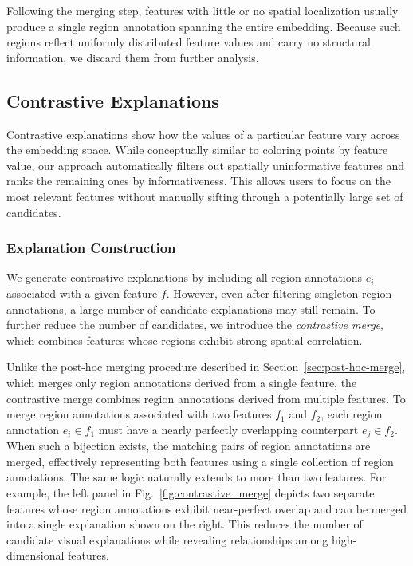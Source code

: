 \documentclass[lettersize,journal]{IEEEtran}
\begin{document}
Following the merging step, features with little or no spatial localization usually produce a single region annotation spanning the entire embedding.
Because such regions reflect uniformly distributed feature values and carry no structural information, we discard them from further analysis.

\subsection{Contrastive Explanations}
\label{sec:contrastive}

Contrastive explanations show how the values of a particular feature vary across the embedding space. While conceptually similar to coloring points by feature value, our approach automatically filters out spatially uninformative features and ranks the remaining ones by informativeness. This allows users to focus on the most relevant features without manually sifting through a potentially large set of candidates.

\subsubsection{Explanation Construction}

We generate contrastive explanations by including all region annotations $e_i$ associated with a given feature $f$.
However, even after filtering singleton region annotations, a large number of candidate explanations may still remain.
To further reduce the number of candidates, we introduce the \textit{contrastive merge}, which combines features whose regions exhibit strong spatial correlation.

Unlike the post-hoc merging procedure described in Section~\ref{sec:post-hoc-merge}, which merges only region annotations derived from a single feature, the contrastive merge combines region annotations derived from multiple features. To merge region annotations associated with two features $f_1$ and $f_2$, each region annotation $e_i \in f_1$ must have a nearly perfectly overlapping counterpart $e_j \in f_2$. When such a bijection exists, the matching pairs of region annotations are merged, effectively representing both features using a single collection of region annotations.
The same logic naturally extends to more than two features.
For example, the left panel in Fig.~\ref{fig:contrastive_merge} depicts two separate features whose region annotations exhibit near-perfect overlap and can be merged into a single explanation shown on the right.
This reduces the number of candidate visual explanations while revealing relationships among high-dimensional features.
\end{document}
